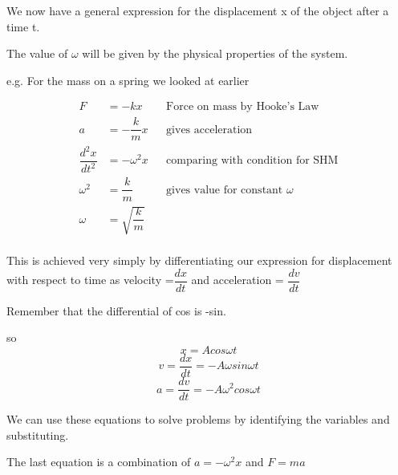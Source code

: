 \documentclass[revision-guide.tex]{subfiles}
\begin{document}
We now have a general expression for the displacement x of the object after a time t.

The value of $\omega$ will be given by the physical properties of the system.

e.g.
For the mass on a spring we looked at earlier

\begin{align*}
F &= -kx && \text {Force on mass by Hooke's Law}\\
a &= -\dfrac{k}{m} x  && \text{gives acceleration}\\
\dfrac{d^2x}{dt^2} &= -\omega ^2 x && \text{comparing with condition for SHM} \\
\omega ^2 &= \dfrac{k}{m} && \text{gives value for constant } \omega \\
\omega &= \sqrt{\dfrac{k}{m}} \\
\end{align*}




This is achieved very simply by differentiating our expression for displacement with respect to time as velocity =$\dfrac{dx}{dt}$ and acceleration = $\dfrac{dv}{dt}$

Remember that the differential of cos is -sin.

so
\[
x = A cos \omega t
\]
\[
v = \dfrac{dx}{dt}= -A \omega sin \omega t
\]
\[
a = \dfrac{dv}{dt}= -A \omega^2 cos \omega t
\]



We can use these equations to solve problems by identifying the variables and substituting.

The last equation is a combination of $a = -\omega^2 x$ and $F = ma$
\end{document}
